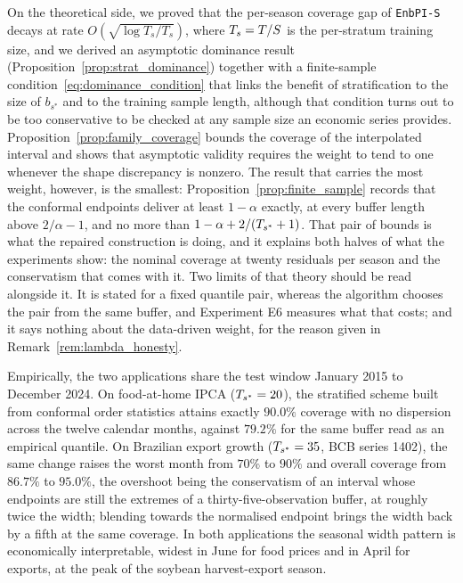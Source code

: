 On the theoretical side, we proved that the per-season coverage gap of
\texttt{EnbPI-S} decays at rate $O(\sqrt{\log T_s / T_s})$, where
$T_s = T/S$ is the per-stratum training size, and we derived an
asymptotic dominance result (Proposition~\ref{prop:strat_dominance})
together with a finite-sample condition~\eqref{eq:dominance_condition}
that links the benefit of stratification to the size of $b_{s^*}$ and
to the training sample length, although that condition turns out to be
too conservative to be checked at any sample size an economic series
provides.  Proposition~\ref{prop:family_coverage} bounds the coverage
of the interpolated interval and shows that asymptotic validity
requires the weight to tend to one whenever the shape discrepancy is
nonzero.  The result that carries the most weight, however, is the
smallest: Proposition~\ref{prop:finite_sample} records that the
conformal endpoints deliver at least $1-\alpha$ exactly, at every
buffer length above $2/\alpha - 1$, and no more than
$1-\alpha + 2/(T_{s^*}+1)$.  That pair of bounds is what the repaired
construction is doing, and it explains both halves of what the
experiments show: the nominal coverage at twenty residuals per season
and the conservatism that comes with it.  Two limits of that theory should be read alongside it.  It is
stated for a fixed quantile pair, whereas the algorithm chooses the
pair from the same buffer, and Experiment E6 measures what that costs;
and it says nothing about the data-driven weight, for the reason given
in Remark~\ref{rem:lambda_honesty}.

Empirically, the two applications share the test window January 2015 to
December 2024.  On food-at-home IPCA ($T_{s^*} = 20$), the stratified
scheme built from conformal order statistics attains exactly $90.0\%$
coverage with no dispersion across the twelve calendar months, against
$79.2\%$ for the same buffer read as an empirical quantile.  On
Brazilian export growth ($T_{s^*} = 35$, BCB series 1402), the same change
raises the worst month from $70\%$ to $90\%$ and overall coverage from
$86.7\%$ to $95.0\%$, the overshoot being the conservatism of an
interval whose endpoints are still the extremes of a
thirty-five-observation buffer, at roughly twice the width; blending
towards the normalised endpoint brings the width back by a fifth at the
same coverage.  In both applications the seasonal width pattern is
economically interpretable, widest in June for food prices and in April
for exports, at the peak of the soybean harvest-export season.


